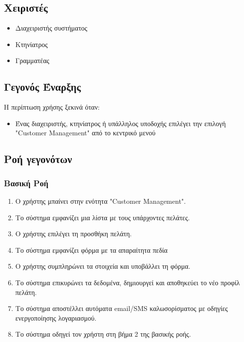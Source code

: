\documentclass[12pt,a4paper,twoside]{book}
\begin{document}
\subsection{Χειριστές}
\begin{itemize}
  \item Διαχειριστής συστήματος
  \item Κτηνίατρος
  \item Γραμματέας
\end{itemize}

\subsection{Γεγονός Έναρξης}
Η περίπτωση χρήσης ξεκινά όταν:
\begin{itemize}
  \item Ένας διαχειριστής, κτηνίατρος ή υπάλληλος υποδοχής επιλέγει την επιλογή "Customer Management" από το κεντρικό μενού %
\end{itemize}

\subsection{Ροή γεγονότων}

\subsubsection{Βασική Ροή}
\begin{enumerate}
  \item Ο χρήστης μπαίνει στην ενότητα "Customer Management". %
  \item Το σύστημα εμφανίζει μια λίστα με τους υπάρχοντες πελάτες.
  \item Ο χρήστης επιλέγει τη προσθήκη πελάτη.
  \item Το σύστημα εμφανίζει φόρμα με τα απαραίτητα πεδία %
  \item Ο χρήστης συμπληρώνει τα στοιχεία και υποβάλλει τη φόρμα.
  \item Το σύστημα επικυρώνει τα δεδομένα, δημιουργεί και αποθηκεύει το νέο προφίλ πελάτη.
  \item Το σύστημα αποστέλλει αυτόματα email/SMS καλωσορίσματος με οδηγίες ενεργοποίησης λογαριασμού.
  \item Το σύστημα οδηγεί τον χρήστη στη βήμα 2 της βασικής ροής.
\end{enumerate}
\end{document}
